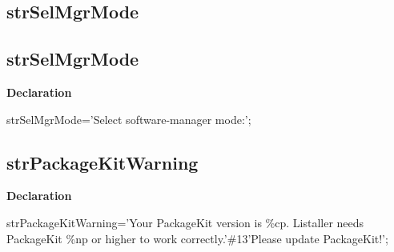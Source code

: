 \documentclass{report}
\newif\ifpdf
\begin{document}
\subsection*{\large{\textbf{strSelMgrMode}}\normalsize\hspace{1ex}\hrulefill}
\else
\subsection*{strSelMgrMode}
\fi
\label{trstrings-strSelMgrMode}
\begin{list}{}{
\setlength{\itemindent}{0cm}
\setlength{\listparindent}{0cm}
\setlength{\leftmargin}{\evensidemargin}
\addtolength{\leftmargin}{\tmplength}
\settowidth{\labelsep}{X}
\addtolength{\leftmargin}{\labelsep}
\setlength{\labelwidth}{\tmplength}
}
\item[\textbf{Declaration}\hfill]
\ifpdf
\begin{flushleft}
\fi
\begin{ttfamily}
strSelMgrMode='Select software-manager mode:';\end{ttfamily}

\ifpdf
\end{flushleft}
\fi

\end{list}
\ifpdf
\subsection*{\large{\textbf{strPackageKitWarning}}\normalsize\hspace{1ex}\hrulefill}
\else
\subsection*{strPackageKitWarning}
\fi
\label{trstrings-strPackageKitWarning}
\begin{list}{}{
\setlength{\itemindent}{0cm}
\setlength{\listparindent}{0cm}
\setlength{\leftmargin}{\evensidemargin}
\addtolength{\leftmargin}{\tmplength}
\settowidth{\labelsep}{X}
\addtolength{\leftmargin}{\labelsep}
\setlength{\labelwidth}{\tmplength}
}
\item[\textbf{Declaration}\hfill]
\ifpdf
\begin{flushleft}
\fi
\begin{ttfamily}
strPackageKitWarning='Your PackageKit version is {\%}cp. Listaller needs PackageKit {\%}np or higher to work correctly.'{\#}13'Please update PackageKit!';\end{ttfamily}

\ifpdf
\end{flushleft}
\fi

\end{list}
\ifpdf
\end{document}
